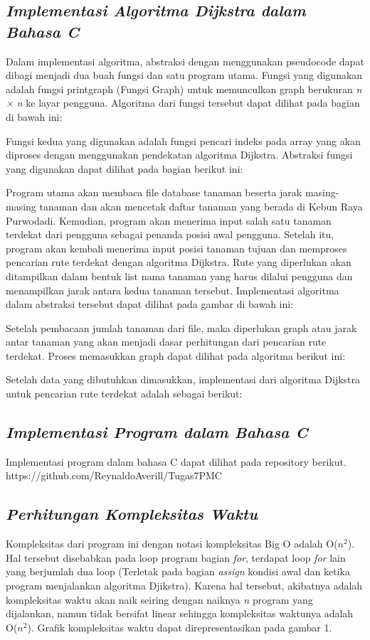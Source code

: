 \documentclass[conference]{IEEEtran}
\begin{document}
\subsection{\textit{Implementasi Algoritma Dijkstra dalam Bahasa C}}
Dalam implementasi algoritma, abstraksi dengan menggunakan pseudocode dapat dibagi menjadi dua buah fungsi dan
satu program utama. Fungsi yang digunakan adalah fungsi
printgraph (Fungsi Graph) untuk memunculkan graph berukuran  \textit{n × n} ke layar pengguna. Algoritma dari fungsi tersebut
dapat dilihat pada bagian di bawah ini:

Fungsi kedua yang digunakan adalah fungsi pencari indeks
pada array yang akan diproses dengan menggunakan pendekatan algoritma Dijkstra. Abstraksi fungsi yang digunakan
dapat dilihat pada bagian berikut ini:

Program utama akan membaca file database tanaman
beserta jarak masing-masing tanaman dan akan mencetak
daftar tanaman yang berada di Kebun Raya Purwodadi.
Kemudian, program akan menerima input salah satu tanaman
terdekat dari pengguna sebagai penanda posisi awal pengguna.
Setelah itu, program akan kembali menerima input posisi
tanaman tujuan dan memproses pencarian rute terdekat dengan
algoritma Dijkstra. Rute yang diperlukan akan ditampilkan
dalam bentuk list nama tanaman yang harus dilalui pengguna
dan menampilkan jarak antara kedua tanaman tersebut.
Implementasi algoritma dalam abstraksi tersebut dapat dilihat
pada gambar di bawah ini:

Setelah pembacaan jumlah tanaman dari file, maka diperlukan graph atau jarak antar tanaman yang akan menjadi dasar
perhitungan dari pencarian rute terdekat. Proses memasukkan
graph dapat dilihat pada algoritma berikut ini:

Setelah data yang dibutuhkan dimasukkan, implementasi
dari algoritma Dijkstra untuk pencarian rute terdekat adalah
sebagai berikut:

\subsection{\textit{Implementasi Program dalam Bahasa C}}
Implementasi program dalam bahasa C dapat dilihat
pada repository berikut. {\color{blue}https://github.com/ReynaldoAverill/Tugas7PMC}

 \subsection{\textit{Perhitungan Kompleksitas Waktu}}
Kompleksitas dari program ini dengan notasi kompleksitas
Big O adalah O($n^{2}$). Hal tersebut disebabkan pada loop
program bagian \textit{for}, terdapat loop \textit{for} lain yang berjumlah
dua loop (Terletak pada bagian \textit{assign} kondisi awal dan ketika
program menjalankan algoritma Djikstra). Karena hal tersebut,
akibatnya adalah kompleksitas waktu akan naik seiring dengan
naiknya \textit{n} program yang dijalankan, namun tidak bersifat
linear sehingga kompleksitas waktunya adalah O($n^{2}$). Grafik
kompleksitas waktu dapat direpresentasikan pada gambar 1.
\end{document}
